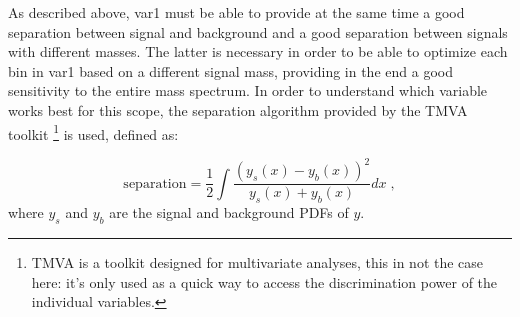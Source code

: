 \noindent As described above, var1 must be able to provide at the same time a good separation between signal and background 
and a good separation between signals with different \hino masses. 
The latter is necessary in order to be able to optimize each bin in var1 based on a different signal mass, 
providing in the end a good sensitivity to the entire mass spectrum. 
In order to understand which variable works best for this scope, the separation algorithm provided by the TMVA toolkit \footnote{TMVA is a toolkit designed for multivariate analyses, this in not the case here: it's only used as a quick way to access the discrimination power of the individual variables.} \cite{Hocker:2007ht} is used, defined as:

\begin{equation}
          \mathrm{separation} = \frac{1}{2} \int\frac{\left(y_s(x) - y_b(x)\right)^2}{y_s(x) + y_b(x)} dx \; , 
\label{eq:separation}
\end{equation}
\noindent where $y_s$ and $y_b$ are the signal and background PDFs of $y$. 


